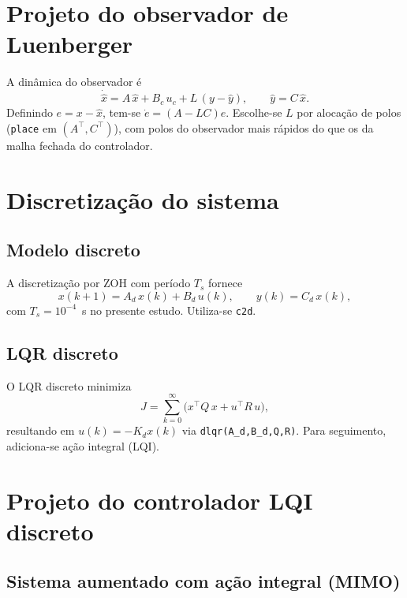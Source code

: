 \section{Projeto do observador de Luenberger}
\label{sec:projeto-observador-luenberger}

A dinâmica do observador é
\[
    \dot{\hat{x}} = A\,\hat{x} + B_c\,u_c + L\,(y-\hat{y}),
    \qquad \hat{y}=C\,\hat{x}.
\]
Definindo $e=x-\hat{x}$, tem-se $\dot{e}=(A-LC)e$. Escolhe-se $L$ por alocação de polos (\texttt{place} em $(A^\top,C^\top)$), com polos do observador mais rápidos do que os da malha fechada do controlador.

\section{Discretização do sistema}
\label{sec:discretizacao-sistema}

\subsection{Modelo discreto}
\label{sec:modelo-discreto}
A discretização por ZOH com período $T_s$ fornece
\[
x(k+1)=A_d\,x(k)+B_d\,u(k),\qquad y(k)=C_d\,x(k),
\]
com $T_s=10^{-4}$~s no presente estudo. Utiliza-se \texttt{c2d}.

\subsection{LQR discreto}
\label{sec:projeto-lqr-discreto}
O LQR discreto minimiza
\[
J=\sum_{k=0}^{\infty} \big(x^\top Q\,x + u^\top R\,u\big),
\]
resultando em $u(k)=-K_d x(k)$ via \texttt{dlqr(A\_d,B\_d,Q,R)}. Para seguimento, adiciona-se ação integral (LQI).

\section{Projeto do controlador LQI discreto}
\label{sec:controle-lqi-discreto}

\subsection{Sistema aumentado com ação integral (MIMO)}
\label{sec:lqi-mimo}

